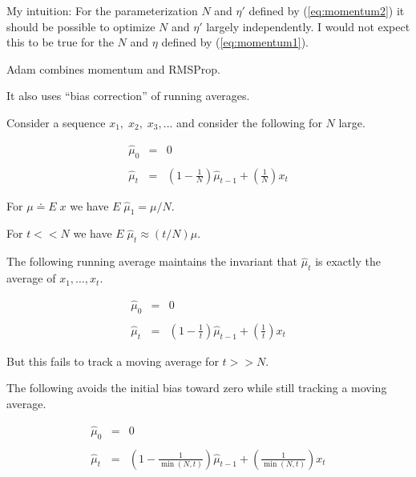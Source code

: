{My intuition: For the parameterization $N$ and $\eta'$ defined by (\ref{eq:momentum2}) it should be possible to optimize $N$ and $\eta'$ largely independently.
I would not expect this to be true for the $N$ and $\eta$ defined by (\ref{eq:momentum1}).


Adam combines momentum and RMSProp.

\vfill
It also uses ``bias correction'' of running averages.


Consider a sequence $x_1,\;x_2,\;x_3,\ldots$ and consider the following for $N$ large.

\begin{eqnarray*}
\hat{\mu}_0 & = & 0 \\
\\
\hat{\mu}_t & = & \left(1-\frac{1}{N}\right)\hat{\mu}_{t-1} + \left(\frac{1}{N}\right)x_t
\end{eqnarray*}

\vfill
For $\mu \doteq E\;x$ we have $E\;\hat{\mu}_1 = \mu/N$.

\vfill
For $t << N$ we have $E\;\hat{\mu}_t \approx (t/N)\mu$.


The following running average maintains the invariant that $\hat{\mu}_t$ is exactly the average of $x_1,\ldots,x_t$.

\begin{eqnarray*}
\hat{\mu}_0 & = & 0 \\
\\
\hat{\mu}_t & = & \left(1-\frac{1}{t}\right)\hat{\mu}_{t-1} + \left(\frac{1}{t}\right)x_t
\end{eqnarray*}

\vfill
But this fails to track a moving average for $t >> N$.


The following avoids the initial bias toward zero while still tracking a moving average.

\begin{eqnarray*}
\hat{\mu}_0 & = & 0 \\
\\
\hat{\mu}_t & = & \left(1-\frac{1}{\min(N,t)}\right)\hat{\mu}_{t-1} + \left(\frac{1}{\min(N,t)}\right)x_t
\end{eqnarray*}

}
